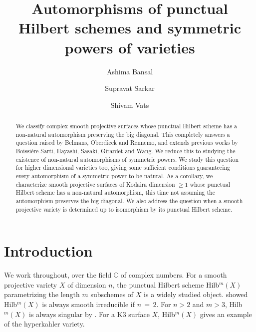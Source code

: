 \documentclass[12pt,reqno]{amsart}
\theoremstyle{definition}
\numberwithin{equation}{section}
\begin{document}
\title[Automorphisms of Hilbert schemes and symmetric powers]{Automorphisms of  punctual Hilbert schemes and symmetric powers of varieties}


\author[A. Bansal]{Ashima Bansal}

\address{Indian Institute of Science Education and Research Tirupati, Srinivasapuram, Yerpedu Mandal, Tirupati Dist, Andhra Pradesh, India – 517619.}


\author[S. Sarkar]{Supravat Sarkar}

\address{\scshape Fine Hall, Princeton, NJ 08544}


\author[S. Vats]{Shivam Vats}

\address{Indian Institute of Science Education and Research Tirupati, Srinivasapuram, Yerpedu Mandal, Tirupati Dist, Andhra Pradesh, India – 517619}




\begin{abstract}
We classify complex smooth projective surfaces whose punctual Hilbert scheme has a non-natural automorphism preserving the big diagonal. This completely answers a question raised by Belmans, Oberdieck and Rennemo, and extends previous works by Boissi{\`e}re-Sarti, Hayashi, Sasaki, Girardet and Wang. We reduce this to studying the existence of non-natural automorphisms of symmetric powers. We study this question for higher dimensional varieties too, giving some sufficient conditions guaranteeing every automorphism of a symmetric power to be natural. As a corollary, we characterize smooth projective surfaces of Kodaira dimension $\geq 1$ whose punctual Hilbert scheme has a non-natural automorphism, this time not assuming the automorphism preserves the big diagonal. We also address the question when a smooth projective variety is determined up to isomorphism by its punctual Hilbert scheme.
\end{abstract}
\maketitle



\section{Introduction}
\noindent 
We work throughout, over the field $\mathbb{C}$ of complex numbers. For a smooth projective variety $X$ of dimension $n$, the punctual Hilbert scheme Hilb$^m(X)$ parametrizing the length $m$ subschemes of $X$ is a widely studied object. \cite{fogarty1968algebraic} showed Hilb$^m(X)$ is always smooth irreducible if $n\,=\,2$. For $n>2$ and $m>3$, Hilb$^m(X)$ is always singular by \cite{skjelnes2020smooth}. For a K3 surface $X$, Hilb$^m(X)$ gives an example of the hyperkahler variety.
\end{document}

